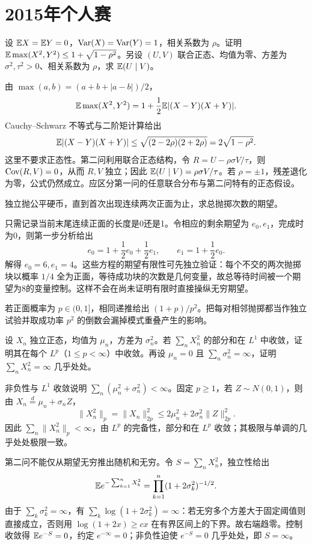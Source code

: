 \section{2015年个人赛}
\begin{example}[原题1：二次矩的最大值与正态回归]\label{yau:2015-1}
设 $\mathbb E X=\mathbb E Y=0$，$\operatorname{Var}(X)=\operatorname{Var}(Y)=1$，相关系数为 $\rho$。证明 $\mathbb E\max(X^2,Y^2)\le1+\sqrt{1-\rho^2}$。另设 $(U,V)$ 联合正态、均值为零、方差为 $\sigma^2,\tau^2>0$、相关系数为 $\rho$，求 $\mathbb E(U\mid V)$。
\end{example}
\begin{solve}
由 $\max(a,b)=(a+b+|a-b|)/2$，
\[
\mathbb E\max(X^2,Y^2)=1+\frac12\mathbb E|(X-Y)(X+Y)|.
\]
Cauchy--Schwarz 不等式与二阶矩计算给出
\[
\mathbb E|(X-Y)(X+Y)|\le\sqrt{(2-2\rho)(2+2\rho)}=2\sqrt{1-\rho^2}.
\]
这里不要求正态性。第二问利用联合正态结构，令 $R=U-\rho\sigma V/\tau$，则 $\operatorname{Cov}(R,V)=0$，从而 $R,V$ 独立；因此 $\mathbb E(U\mid V)=\rho\sigma V/\tau$。若 $\rho=\pm1$，残差退化为零，公式仍然成立。应区分第一问的任意联合分布与第二问特有的正态假设。
\end{solve}

\begin{example}[原题2：连续两次正面的等待时间]\label{yau:2015-2}
独立抛公平硬币，直到首次出现连续两次正面为止，求总抛掷次数的期望。
\end{example}
\begin{solve}
只需记录当前末尾连续正面的长度是0还是1。令相应的剩余期望为 $e_0,e_1$，完成时为0，则第一步分析给出
\[
e_0=1+\frac12e_0+\frac12e_1,\qquad e_1=1+\frac12e_0.
\]
解得 $e_0=6,e_1=4$。这些方程的期望有限性可先独立验证：每个不交的两次抛掷块以概率 $1/4$ 全为正面，等待成功块的次数是几何变量，故总等待时间被一个期望为8的变量控制。这样不会在尚未证明有限时直接操纵无穷期望。

若正面概率为 $p\in(0,1]$，相同递推给出 $(1+p)/p^2$。把每对相邻抛掷都当作独立试验并取成功率 $p^2$ 的倒数会漏掉模式重叠产生的影响。
\end{solve}

\begin{example}[原题3：正态平方级数的可积性]\label{yau:2015-3}
设 $X_n$ 独立正态，均值为 $\mu_n$，方差为 $\sigma_n^2$。若 $\sum_nX_n^2$ 的部分和在 $L^1$ 中收敛，证明其在每个 $L^p$（$1\le p<\infty$）中收敛。再设 $\mu_n=0$ 且 $\sum_n\sigma_n^2=\infty$，证明 $\sum_nX_n^2=\infty$ 几乎处处。
\end{example}
\begin{solve}
非负性与 $L^1$ 收敛说明 $\sum_n(\mu_n^2+\sigma_n^2)<\infty$。固定 $p\ge1$，若 $Z\sim N(0,1)$，则由 $X_n\overset d=\mu_n+\sigma_nZ$，
\[
\|X_n^2\|_p=\|X_n\|_{2p}^2\le2\mu_n^2+2\sigma_n^2\|Z\|_{2p}^2.
\]
因此 $\sum_n\|X_n^2\|_p<\infty$，由 $L^p$ 的完备性，部分和在 $L^p$ 收敛；其极限与单调的几乎处处极限一致。

第二问不能仅从期望无穷推出随机和无穷。令 $S=\sum_nX_n^2$，独立性给出
\[
\mathbb E e^{-\sum_{k=1}^nX_k^2}=\prod_{k=1}^n(1+2\sigma_k^2)^{-1/2}.
\]
由于 $\sum_k\sigma_k^2=\infty$，有 $\sum_k\log(1+2\sigma_k^2)=\infty$：若无穷多个方差大于固定阈值则直接成立，否则用 $\log(1+2x)\ge c x$ 在有界区间上的下界。故右端趋零。控制收敛得 $\mathbb E e^{-S}=0$，约定 $e^{-\infty}=0$；非负性迫使 $e^{-S}=0$ 几乎处处，即 $S=\infty$。
\end{solve}

